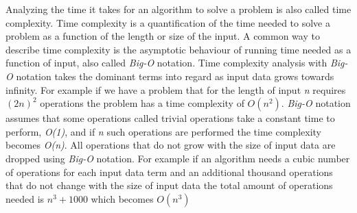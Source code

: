 \documentclass[a4paper,11pt]{kth-mag}
\begin{document}
Analyzing the time it takes for an algorithm to solve a problem is also called time complexity. Time complexity is a quantification of the time needed to solve a problem as a function of the length or size of the input. A common way to describe time complexity is the asymptotic behaviour of running time needed as a function of input, also called \textit{Big-O} notation. Time complexity analysis with \textit{Big-O} notation takes the dominant terms into regard as input data grows towards infinity. For example if we have a problem that for the length of input \textit{n} requires $(2n)^2$ operations the problem has a time complexity of $O(n^2)$. \textit{Big-O} notation assumes that some operations called trivial operations take a constant time to perform, \textit{O(1)}, and if \textit{n} such operations are performed the time complexity becomes \textit{O(n)}. All operations that do not grow with the size of input data are dropped using \textit{Big-O} notation. For example if an algorithm needs a cubic number of operations for each input data term and an additional thousand operations that do not change with the size of input data the total amount of operations needed is $n^3 + 1000$ which becomes $O(n^3)$
\end{document}
